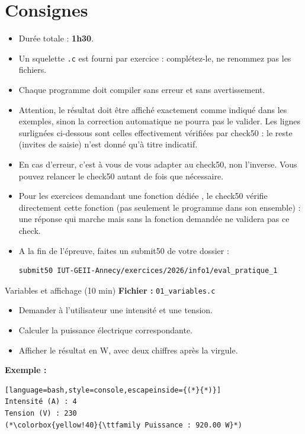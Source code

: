 \section*{Consignes}
\begin{itemize}
  \item Durée totale : \textbf{1h30}.
  \item Un squelette \texttt{.c} est fourni par exercice : complétez-le, ne renommez pas les fichiers.
  \item Chaque programme doit compiler sans erreur et sans avertissement.
  \item Attention, le résultat doit être affiché exactement comme indiqué dans les exemples, sinon la correction automatique ne pourra pas le valider. Les lignes surlignées ci-dessous sont celles effectivement vérifiées par check50 : le reste (invites de saisie) n'est donné qu'à titre indicatif.
  \item En cas d'erreur, c'est à vous de vous adapter au check50, non l'inverse. Vous pouvez relancer le check50 autant de fois que nécessaire.
  \item Pour les exercices demandant \og une fonction dédiée \fg{}, le check50 vérifie directement cette fonction (pas seulement le programme dans son ensemble) : une réponse qui marche mais sans la fonction demandée ne validera pas ce check.
  \item A la fin de l'épreuve, faites un submit50 de votre dossier :
  \begin{lstlisting}[language=bash,style=console]
submit50 IUT-GEII-Annecy/exercices/2026/info1/eval_pratique_1
  \end{lstlisting}
\end{itemize}

\begin{UPSTIexercice}{Variables et affichage (10 min)}
  \textbf{Fichier :} \texttt{01\_variables.c}
  \begin{itemize}
    \item Demander à l'utilisateur une intensité et une tension.
    \item Calculer la puissance électrique correspondante.
    \item Afficher le résultat en W, avec deux chiffres après la virgule.
  \end{itemize}

  \textbf{Exemple :}
  \begin{lstlisting}[language=bash,style=console,escapeinside={(*}{*)}]
Intensité (A) : 4
Tension (V) : 230
(*\colorbox{yellow!40}{\ttfamily Puissance : 920.00 W}*)
  \end{lstlisting}
\end{UPSTIexercice}

